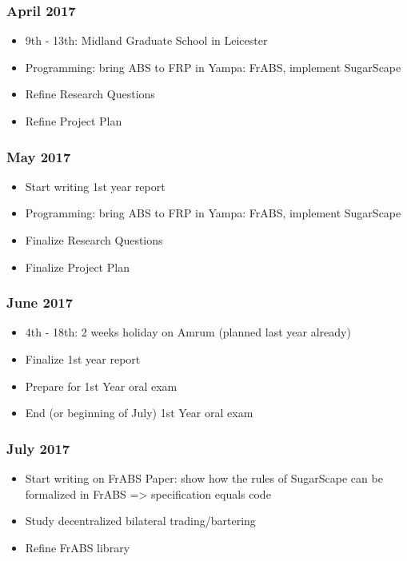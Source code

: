 \subsubsection{April 2017}
\begin{itemize}
	\item 9th - 13th: Midland Graduate School in Leicester
	\item Programming: bring ABS to FRP in Yampa: FrABS, implement SugarScape
	\item Refine Research Questions
	\item Refine Project Plan
\end{itemize}

\subsubsection{May 2017}
\begin{itemize}
	\item Start writing 1st year report
	\item Programming: bring ABS to FRP in Yampa: FrABS, implement SugarScape
	\item Finalize Research Questions
	\item Finalize Project Plan
\end{itemize}

\subsubsection{June 2017}
\begin{itemize}
	\item 4th - 18th: 2 weeks holiday on Amrum (planned last year already)
	\item Finalize 1st year report
	\item Prepare for 1st Year oral exam
	\item End (or beginning of July) 1st Year oral exam
\end{itemize}

\subsubsection{July 2017}
\begin{itemize}
	\item Start writing on FrABS Paper: show how the rules of SugarScape can be formalized in FrABS => specification equals code
	\item Study decentralized bilateral trading/bartering
	\item Refine FrABS library
\end{itemize}

